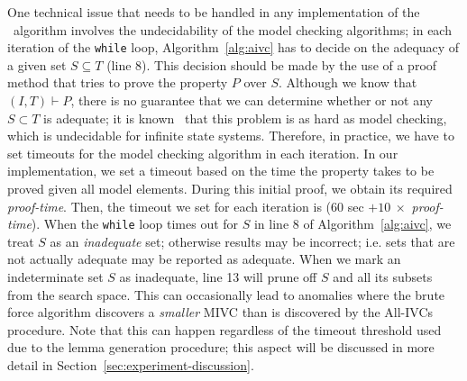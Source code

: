 One technical issue that needs to
be handled in any implementation of the \aivcalg ~algorithm involves the undecidability of the model checking algorithms;
in each iteration of the \texttt{while} loop, Algorithm~\ref{alg:aivc}
has to decide on the adequacy of a given set $S \subseteq T$ (line 8).
This decision should be made by the use of a proof method that
tries to prove the property $P$ over $S$. Although we know that $(I, T) \vdash P$,
there is no guarantee that we can determine whether or not any $S \subset T$ is adequate; it is known~\cite{Ghass16} that 
this problem is as hard as model checking, which is undecidable for infinite state systems.
Therefore, in practice, we have to set timeouts for the model checking algorithm in each iteration.
In our implementation, we set a timeout based on the time the property takes to be proved given all model elements.
During this initial proof, we obtain its required \emph{proof-time}.
Then, the timeout we set for each iteration is ($60$ sec  $+ 10\ \times$ \emph{proof-time}).
When the \texttt{while} loop times out for $S$ in line 8 of Algorithm~\ref{alg:aivc},
we treat $S$ as an \emph{inadequate} set; 
otherwise results may be incorrect; i.e. sets that are not actually adequate may be reported as adequate. 
When we mark an indeterminate set $S$ as inadequate, line 13 will prune off $S$ and all its subsets from 
the search space.  This can occasionally lead to anomalies where the brute force algorithm discovers a {\em smaller} 
MIVC than is discovered by the All-IVCs procedure.  Note that this can happen regardless of the timeout threshold used 
due to the lemma generation procedure; this aspect will be discussed in more detail in 
Section~\ref{sec:experiment-discussion}.


%

